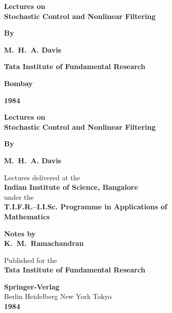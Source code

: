 \thispagestyle{empty}
\begin{center}
{\Large\bf Lectures on}\\[5pt]
{\Large\bf Stochastic Control and Nonlinear Filtering}
\vskip 1cm

{\bf By}
\medskip

{\large\bf M.~H.~A. Davis}
\vfill

{\bf Tata Institute of Fundamental Research}

{\bf Bombay}

{\bf 1984}
\end{center}
\eject

\thispagestyle{empty}
\begin{center}
{\Large\bf Lectures on}\\[5pt]
{\Large\bf Stochastic Control and Nonlinear Filtering}
\vskip 1cm

{\bf By}
\medskip

{\large\bf M.~H.~A. Davis}
\vfill

{Lectures delivered at the}\\
{\bf Indian Institute of Science, Bangalore}\\[5pt]
{under the}\\[5pt]
{\bf T.I.F.R.--I.I.Sc. Programme in Applications of}\\[5pt]
{\bf Mathematics}
\vfill

{\bf Notes by}\\[5pt]
{\large\bf K.~M.~Ramachandran}
\vfill

{Published for the}\\[5pt]
{\bf Tata Institute of Fundamental Research}
\vfill

{\bf Springer-Verlag}\\
{Berlin Heidelberg New York Tokyo}\\
{\bf 1984}
\end{center}
\eject

